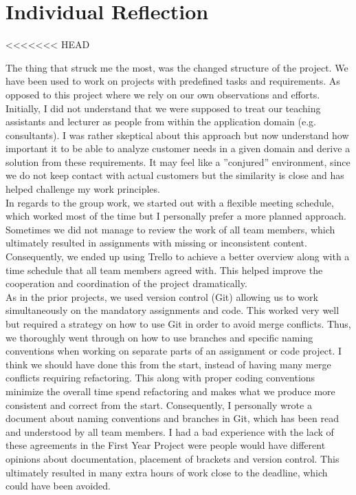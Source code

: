 \section{Individual Reflection}
<<<<<<< HEAD

The thing that struck me the most, was the changed structure of the project. We have been used to work on projects with predefined tasks and requirements. As opposed to this project where we rely on our own observations and efforts. Initially, I did not understand that we were supposed to treat our teaching assistants and lecturer as people from within the application domain (e.g. consultants). I was rather skeptical about this approach but now understand how important it to be able to analyze customer needs in a given domain and derive a solution from these requirements. It may feel like a ”conjured” environment, since we do not keep contact with actual customers but the similarity is close and has helped challenge my work principles. 
\\
In regards to the group work, we started out with a flexible meeting schedule, which worked most of the time but I personally prefer a more planned approach. Sometimes we did not manage to review the work of all team members, which ultimately resulted in assignments with missing or inconsistent content. Consequently, we ended up using Trello to achieve a better overview along with a time schedule that all team members agreed with. This helped improve the cooperation and coordination of the project dramatically. 
\\
As in the prior projects, we used version control (Git) allowing us to work simultaneously on the mandatory assignments and code. This worked very well but required a strategy on how to use Git in order to avoid merge conflicts. Thus, we thoroughly went through on how to use branches and specific naming conventions when working on separate parts of an assignment or code project. I think we should have done this from the start, instead of having many merge conflicts requiring refactoring. This along with proper coding conventions minimize the overall time spend refactoring and makes what we produce more consistent and correct from the start. Consequently, I personally wrote a document about naming conventions and branches in Git, which has been read and understood by all team members. I had a bad experience with the lack of these agreements in the First Year Project were people would have different opinions about documentation, placement of brackets and version control. This ultimately resulted in many extra hours of work close to the deadline, which could have been avoided. 
